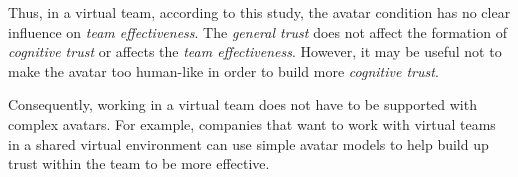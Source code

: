 \documentclass[sigchi]{acmart}
\begin{document}
Thus, in a virtual team, according to this study, the avatar condition has no clear influence on \textit{team effectiveness}. The \textit{general trust} does not affect the formation of \textit{cognitive trust} or affects the \textit{team effectiveness}. However, it may be useful not to make the avatar too human-like in order to build more \textit{cognitive trust}.

Consequently, working in a virtual team does not have to be supported with complex avatars. For example, companies that want to work with virtual teams in a shared virtual environment can use simple avatar models to help build up trust within the team to be more effective.





\appendix
\end{document}
